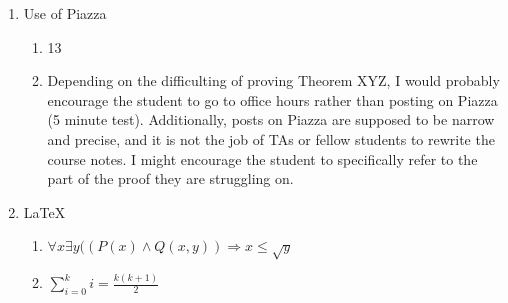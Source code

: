 \documentclass{article}
\begin{document}
\begin{enumerate}
		\huge
		\item Use of Piazza
		
		\normalsize
		\begin{enumerate}
			\item 13
			\item Depending on the difficulting of proving Theorem XYZ, I would probably encourage the student to go to office hours rather than posting on Piazza (5 minute test). Additionally, posts on Piazza are supposed to be narrow and precise, and it is not the job of TAs or fellow students to rewrite the course notes. I might encourage the student to specifically refer to the part of the proof they are struggling on. 
		\end{enumerate}
		
		\huge
		\item  \LaTeX
		
		\normalsize
		\begin{enumerate}
			\item $\forall x \exists y ((P(x) \land Q(x,y)) \Longrightarrow x \leq \sqrt{y} $
			\item $\displaystyle \sum_{i=0}^{k} {i} = \frac{k(k+1)}{2} $
		\end{enumerate}
	\end{enumerate}
	
\end{document}
